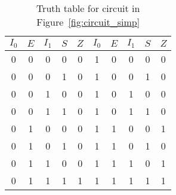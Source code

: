 \documentclass{article}
\begin{document}
\begin{table}[hbtp]
  \label{tab:truth_simp}
  \centering
  \begin{tabular}{cccc|c || cccc|c}
    $I_0$ & $E$ & $I_1$ & $S$ & $Z$ & $I_0$ & $E$ & $I_1$ & $S$ & $Z$ \\
    \hline
    0 & 0 & 0 & 0 & 0 & 1 & 0 & 0 & 0 & 0 \\
    0 & 0 & 0 & 1 & 0 & 1 & 0 & 0 & 1 & 0 \\
    0 & 0 & 1 & 0 & 0 & 1 & 0 & 1 & 0 & 0 \\
    0 & 0 & 1 & 1 & 0 & 1 & 0 & 1 & 1 & 0 \\
    0 & 1 & 0 & 0 & 0 & 1 & 1 & 0 & 0 & 1 \\
    0 & 1 & 0 & 1 & 0 & 1 & 1 & 0 & 1 & 0 \\
    0 & 1 & 1 & 0 & 0 & 1 & 1 & 1 & 0 & 1 \\
    0 & 1 & 1 & 1 & 1 & 1 & 1 & 1 & 1 & 1 \\
  \end{tabular}
  \caption{Truth table for circuit in Figure~\ref{fig:circuit_simp}}
\end{table}
\end{document}
